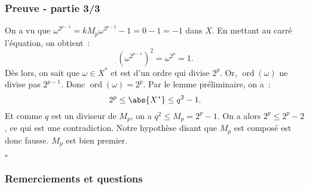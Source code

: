 \documentclass[10pt, mathserif]{beamer}
\DeclareMathOperator{\ord}{ord}
\theoremstyle{definition}
\theoremstyle{remark}
\begin{document}
	\begin{frame}
		\frametitle{Preuve - partie 3/3}

		On a vu que $\omega^{2^{p-1}} = kM_p\omega^{2^{p-2}} - 1 = 0 - 1 = -1$ dans $X$. En mettant au carré l'équation, on obtient~:
		\[\left(\omega^{2^{p-1}}\right)^2 = \omega^{2^p} = 1.\]
		Dès lors, on sait que $\omega \in X^*$ et est d'un ordre qui divise $2^p$. Or, $\ord(\omega)$ ne divise pas $2^{p-1}$. Donc $\ord(\omega) = 2^p$.
		Par le lemme préliminaire, on a~:
		\[2^p \leq \abs {X^*} \leq q^2 - 1.\]
		Et comme $q$ est un diviseur de $M_p$, on a $q^2 \leq M_p = 2^p-1$. On a alors $2^p \leq 2^p - 2$, ce qui est une contradiction. Notre hypothèse disant que
		$M_p$ est composé est donc fausse. $M_p$ est bien premier.
		
		\begin{flushright}$\square$\end{flushright}
	\end{frame}

	\begin{frame}
		\frametitle{Remerciements et questions}
	\end{frame}
\end{document}
